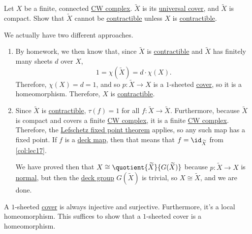 \begin{eg}[QR May.\ 2016]
	Let \(X\) be a finite, connected \hyperref[def:CW-Complex]{CW complex}. \(\widetilde{X}\) is its \hyperref[def:universal-covering]{universal cover},
	and \(\widetilde{X}\) is compact. Show that \(\widetilde{X}\) cannot be \hyperref[def:contractible]{contractible} unless \(X\) is \hyperref[def:contractible]{contractible}.
\end{eg}
\begin{explanation}
	We actually have two different approaches.
	\begin{enumerate}
		\item By homework, we then know that, since \(\widetilde{X}\) is \hyperref[def:contractible]{contractible} and \(\widetilde{X}\)
		      has finitely many sheets \(d\) over \(X\),
		      \[
			      1 = \chi(\widetilde{X}) = d \cdot \chi(X).
		      \]
		      Therefore, \(\chi(X) = d = 1\), and so \(p \colon \widetilde{X} \to X\) is a \(1\)-sheeted \hyperref[def:covering-map]{cover}, so
		      it is a homeomorphism. Therefore, \(X\) is \hyperref[def:contractible]{contractible}.
		\item Since \(\widetilde{X}\) is \hyperref[def:contractible]{contractible}, \(\tau(f) = 1\) for all \(f \colon \widetilde{X} \to \widetilde{X}\).
		      Furthermore, because \(\widetilde{X}\) is compact and covers a finite \hyperref[def:CW-Complex]{CW complex}, it is a finite \hyperref[def:CW-Complex]{CW complex}.
		      Therefore, the \hyperref[thm:Lefschetz-fixed-point]{Lefschetz fixed point theorem} applies, so any such map has a fixed point. If \(f\) is a
		      \hyperref[def:deck-transformation]{deck map}, then that means that \(f = \id_{\widetilde{X}}\) from \autoref{col:lec17}.

		      We have proved then that \(X \cong \quotient{\widetilde{X}}{G(\widetilde{X})}\) because \(p \colon \widetilde{X} \to X\) is \hyperref[def:normal-cover]{normal},
		      but then the \hyperref[def:deck-transformation]{deck group} \(G(\widetilde{X})\) is trivial, so \(X \cong \widetilde{X}\), and we are done.
	\end{enumerate}
\end{explanation}
\begin{exercise}
	A \(1\)-sheeted \hyperref[def:covering-map]{cover} is always injective and surjective. Furthermore, it's a local homeomorphism.
	This suffices to show that a \(1\)-sheeted cover is a homeomorphism.
\end{exercise}

